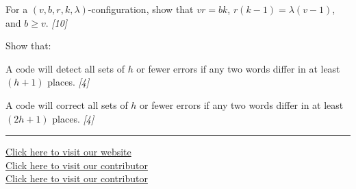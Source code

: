\documentclass[11pt,a4paper]{article}
\newcommand{\pts}[1]{\hfill   \textit{[#1]}}
\begin{document}
\begin{parts}
  \item For a $(v,b,r,k,\lambda)$-configuration, show that $vr = bk$, $r(k-1) = \lambda(v-1)$, and $b \ge v$. \pts{10}
  \item Show that:
  
\begin{parts}
    \item A code will detect all sets of $h$ or fewer errors if any two words differ in at least $(h+1)$ places. \pts{4}
    \item A code will correct all sets of $h$ or fewer errors if any two words differ in at least $(2h+1)$ places. \pts{4}
  \end{parts}
\end{parts}



\vfill
\rule{\linewidth}{0.4pt}

\begin{center}\small
\href{https://bhu-exam.vercel.app/}{Click here to visit our website}\\[4pt]\href{https://me-aryan.vercel.app/}{Click here to visit our contributor}\\[4pt]\href{https://quashan-me.vercel.app/}{Click here to visit our contributor}
\end{center}
\end{document}

